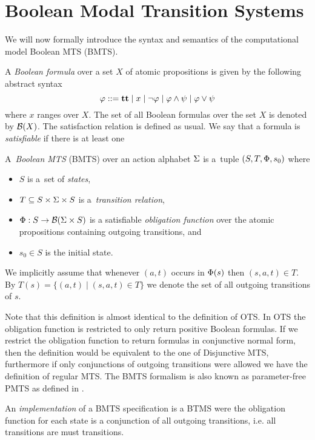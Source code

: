 \section{Boolean Modal Transition Systems}
We will now formally introduce the syntax and semantics of the computational model Boolean MTS (BMTS).

A \emph{Boolean formula} over a set $X$ of atomic propositions is given by
the following abstract syntax 
\[ 
\varphi ::= \mathbf{tt} \mid x \mid \neg \varphi \mid \varphi \wedge \psi 
\mid \varphi \vee \psi \]
where $x$ ranges over $X$. 
The set of all Boolean formulas over the set $X$
is denoted by $\mathcal B(X)$. 
The satisfaction relation is defined as usual. We say that a formula is \emph{satisfiable} if there is at least one 

\begin{definition}
A~\emph{Boolean MTS} (BMTS) over an action alphabet $\mathrm{\Sigma}$ is 
a~tuple $(S,T,\mathrm{\Phi},s_0)$ where
\begin{itemize}
	\item $S$ is a~set of \emph{states},
	\item $T \subseteq S \times \mathrm{\Sigma} \times S$ is a~\emph{transition relation},
	\item $\mathrm{\Phi} : S \to \mathcal B(\mathrm{\Sigma} \times S)$ is a satisfiable \emph{obligation function} over the atomic propositions containing outgoing transitions, and
	\item $s_0 \in S$ is the initial state. 
\end{itemize}
We implicitly assume that whenever $(a,t)$ occurs in $\mathrm{\Phi}(s)$ then $(s,a,t) \in T$.
By $T(s) = \{(a,t) \mid (s,a,t) \in T\}$ we denote the set of all outgoing transitions of $s$. 
\end{definition}

Note that this definition is almost identical to the definition of OTS. In OTS the obligation function is restricted to only return positive Boolean formulas. If we restrict the obligation function to return formulas in conjunctive normal form, then the definition would be equivalent to the one of Disjunctive MTS, furthermore if only conjunctions of outgoing transitions were allowed we have the definition of regular MTS. The BMTS formalism is also known as parameter-free PMTS as defined in \cite{BKLMS:ATVA:11}.

An \emph{implementation} of a BMTS specification is a BTMS were the obligation function for each state is a conjunction of all outgoing transitions, i.e. all transitions are must transitions.

